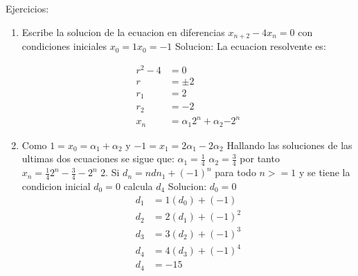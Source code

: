 \documentclass{article}
\begin{document}
Ejercicios:
\begin{enumerate}
\item 

Escribe la solucion de la ecuacion en diferencias $x_{n+2}-4x_n=0$
con condiciones iniciales $x_{0}=1  x_{0}=-1$
Solucion:
La ecuacion resolvente es:

\begin{align*}
  r^{2}-4&=0\\
  r&=\pm 2\\ 
  r_1&=2\\
  r_2&=-2\\
  x_n&=\alpha_1{2^{n}}+\alpha_2{-2^{n}}
\end{align*}
\item
  
Como $1=x_0=\alpha_1+\alpha_2$  y
$-1=x_1=2\alpha_1-2\alpha_2$
Hallando las soluciones de las ultimas dos ecuaciones se sigue que:
$\alpha_1=\frac{1}{4}$ $\alpha_2=\frac{3}{4}$
por tanto $x_n=\frac{1}{4} 2^{n}-\frac{3}{4} -2^{n}$
2. Si $d_n=ndn_1+(-1)^n$ para todo $n>=1$ y se tiene la condicion inicial $d_0=0$ calcula $d_4$
Solucion:
$d_0=0$
\begin{align*}
  d_1&=1(d_0)+(-1)\\
  d_2&=2(d_1)+(-1)^2\\
  d_3&=3(d_2)+(-1)^3\\
  d_4&=4(d_3)+(-1)^4\\
  d_4&=-15
\end{align*}
\end{enumerate}
\end{document}
